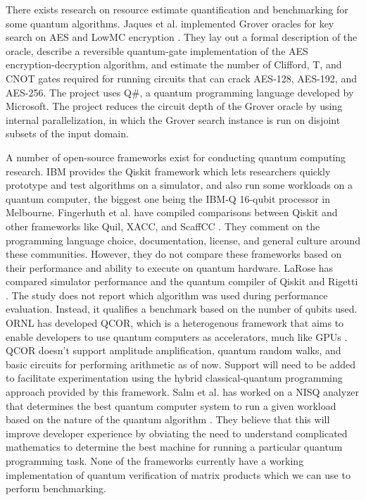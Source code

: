\documentclass[11pt]{article}
\theoremstyle{definition}
\theoremstyle{remark}
\begin{document}
There exists research on resource estimate quantification and benchmarking for
some quantum algorithms. Jaques et al. implemented Grover oracles for key
search on AES and LowMC encryption \cite{jaques2020implementing}. They lay
out a formal description of the oracle,  describe a reversible quantum-gate
implementation of the AES encryption-decryption algorithm, and estimate the
number of Clifford, T, and CNOT gates required for running circuits that can
crack AES-128, AES-192, and AES-256. The project uses Q\#, a quantum
programming language developed by Microsoft. The project reduces the circuit
depth of the Grover oracle by using internal parallelization, in which the
Grover search instance is run on disjoint subsets of the input domain.

A number of open-source frameworks exist for conducting quantum computing
research. IBM provides the Qiskit framework which lets researchers quickly
prototype and test algorithms on a simulator, and also run some workloads on a
quantum computer, the biggest one being the IBM-Q 16-qubit processor in
Melbourne. Fingerhuth et al. have compiled comparisons between Qiskit and other
frameworks like Quil, XACC, and ScaffCC \cite{fingerhuth2018open}. They comment
on the programming language choice, documentation, license, and general culture
around these communities. However, they do not compare these frameworks based on
their performance and ability to execute on quantum hardware. LaRose has
compared simulator performance and the quantum compiler of Qiskit and Rigetti
\cite{larose2019overview}.  The study does not report which algorithm was used
during performance evaluation. Instead, it qualifies a benchmark based on the
number of qubits used. ORNL has developed QCOR, which is a heterogenous
framework that aims to enable developers to use quantum computers as
accelerators, much like GPUs \cite{mintz2020qcor}. QCOR doesn’t support
amplitude amplification, quantum random walks, and basic circuits for performing
arithmetic as of now. Support will need to be added to facilitate
experimentation using the hybrid classical-quantum programming approach provided
by this framework. Salm et al. has worked on a NISQ analyzer that determines the
best quantum computer system to run a given workload based on the nature of the
quantum algorithm \cite{dustdar2020nisq}. They believe that this will improve
developer experience by obviating the need to understand complicated mathematics
to determine the best machine for running a particular quantum programming task.
None of the frameworks currently have a working implementation of quantum
verification of matrix products which we can use to perform benchmarking.
\end{document}
